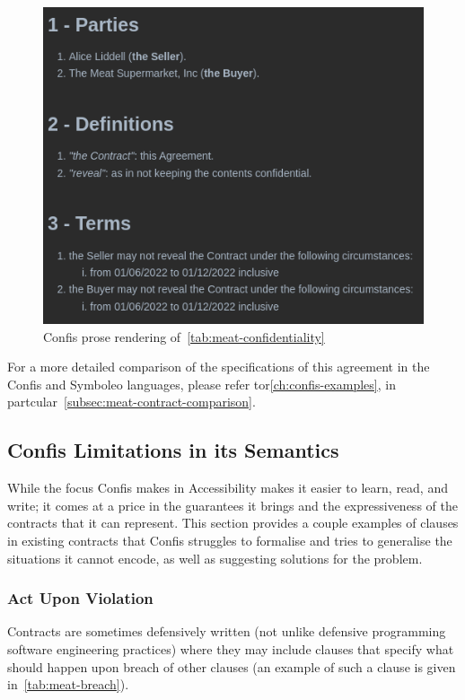 \begin{figure}[H]
    \centering
    \includegraphics[width=0.67\columnwidth]{figures/confis.meat.prose}
    \caption{Confis prose rendering of~\autoref{tab:meat-confidentiality}}
    \label{fig:confis-render-meat-confidentiality}
\end{figure}

For a more detailed comparison of the specifications of this agreement in the Confis and Symboleo languages, please refer tor\autoref{ch:confis-examples}, in partcular~\autoref{subsec:meat-contract-comparison}.

\subsection{Confis Limitations in its Semantics}\label{subsec:confis-lang-limits}

While the focus Confis makes in Accessibility makes it easier to learn, read, and write;
it comes at a price in the guarantees it brings and the expressiveness of the contracts that it can represent.
This section provides a couple examples of clauses in existing contracts that Confis struggles to formalise and tries to generalise the situations it cannot encode, as well as suggesting solutions for the problem.

\subsubsection{Act Upon Violation}
\label{subsubsec:limits-violations}

Contracts are sometimes defensively written (not unlike defensive programming software engineering practices) where they may include clauses that specify what should happen upon breach of other clauses (an example of such a clause is given in~\autoref{tab:meat-breach}).

